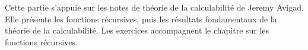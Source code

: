 \documentclass[../../include/open-logic-part]{subfiles}
\begin{document}
\begin{OLPartNotice}{}
Cette partie s'appuie sur les notes de théorie de la calculabilité de
Jeremy Avigad. Elle présente les fonctions récursives, puis les
résultats fondamentaux de la théorie de la calculabilité. Les
exercices accompagnent le chapitre sur les fonctions récursives.
\end{OLPartNotice}



\OLEndPartHook
\end{document}
